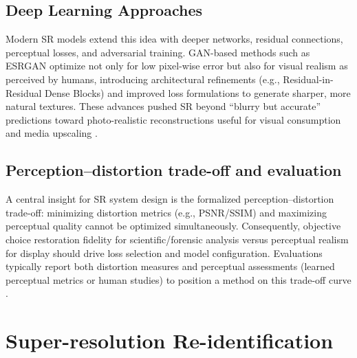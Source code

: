 \subsection{Deep Learning Approaches}

Modern \acs{SR} models extend this idea with deeper networks, residual connections, perceptual losses, and adversarial training. GAN-based methods such as ESRGAN optimize not only for low pixel-wise error but also for visual realism as perceived by humans, introducing architectural refinements (e.g., Residual-in-Residual Dense Blocks) and improved loss formulations to generate sharper, more natural textures. These advances pushed \acs{SR} beyond “blurry but accurate” predictions toward photo-realistic reconstructions useful for visual consumption and media upscaling \cite{Wang2019ESRGAN}.

\subsection{Perception–distortion trade-off and evaluation}

A central insight for \acs{SR} system design is the formalized perception–distortion trade-off: minimizing distortion metrics (e.g., PSNR/SSIM) and maximizing perceptual quality cannot be optimized simultaneously. Consequently, objective choice restoration fidelity for scientific/forensic analysis versus perceptual realism for display should drive loss selection and model configuration. Evaluations typically report both distortion measures and perceptual assessments (learned perceptual metrics or human studies) to position a method on this trade-off curve \cite{Blau2018PerceptionDistortion}.

\section{Super-resolution Re-identification}
